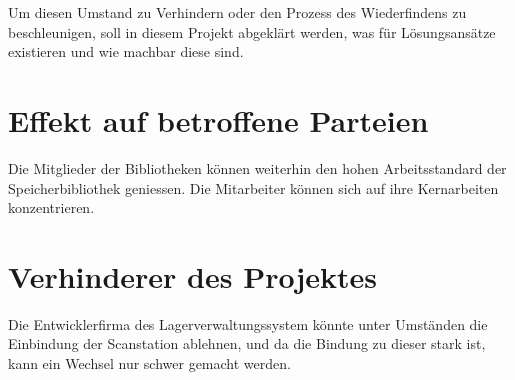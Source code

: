 Um diesen Umstand zu Verhindern oder den Prozess des Wiederfindens zu beschleunigen, soll in diesem Projekt abgeklärt werden, was für Lösungsansätze existieren und wie machbar diese sind.

\section{Effekt auf betroffene Parteien}
Die Mitglieder der Bibliotheken können weiterhin den hohen Arbeitsstandard der Speicherbibliothek geniessen.
Die Mitarbeiter können sich auf ihre Kernarbeiten konzentrieren.

\section{Verhinderer des Projektes}
Die Entwicklerfirma des Lagerverwaltungssystem könnte unter Umständen die Einbindung der Scanstation ablehnen, und da die Bindung zu dieser stark ist, kann ein Wechsel nur schwer gemacht werden.
